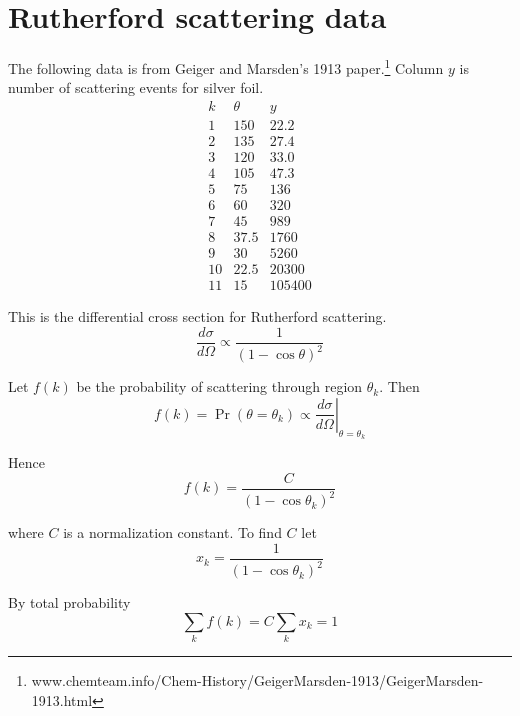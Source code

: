 

\section*{Rutherford scattering data}

The following data is from Geiger and Marsden's 1913 paper.\footnote{www.chemteam.info/Chem-History/GeigerMarsden-1913/GeigerMarsden-1913.html}
Column $y$ is number of scattering events for silver foil.
\begin{equation*}
\begin{matrix}
k & \theta & y\\
1 & 150 & 22.2\\
2 & 135 & 27.4\\
3 & 120 & 33.0\\
4 & 105 & 47.3\\
5 & 75 & 136\\
6 & 60 & 320\\
7 & 45 & 989\\
8 & 37.5 & 1760\\
9 & 30 & 5260\\
10 & 22.5 & 20300\\
11 & 15 & 105400
\end{matrix}
\end{equation*}

This is the differential cross section for Rutherford scattering.
\begin{equation*}
\frac{d\sigma}{d\Omega}\propto
\frac{1}{(1-\cos\theta)^2}
\end{equation*}

Let $f(k)$ be the probability of scattering through region $\theta_k$.
Then
\begin{equation*}
f(k)=\Pr(\theta=\theta_k)\propto\left.\frac{d\sigma}{d\Omega}\right|_{\theta=\theta_k}
\end{equation*}

Hence
\begin{equation*}
f(k)=\frac{C}{(1-\cos\theta_k)^2}
\end{equation*}

where $C$ is a normalization constant.
To find $C$ let
\begin{equation*}
x_k=\frac{1}{(1-\cos\theta_k)^2}
\end{equation*}

By total probability
\begin{equation*}
\sum_k f(k)=C\sum_k x_k=1
\end{equation*}

